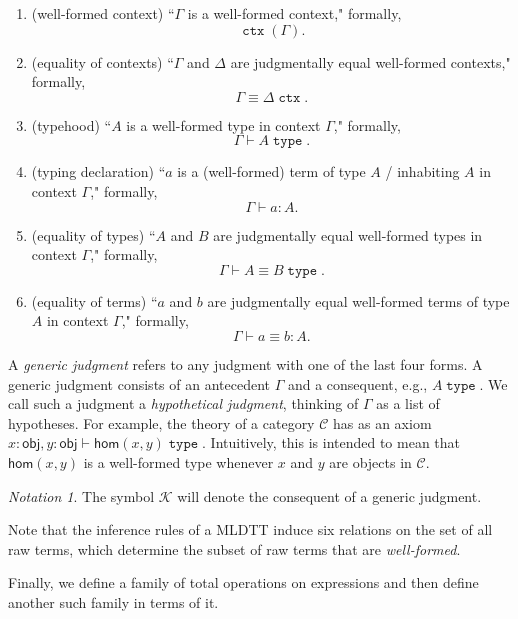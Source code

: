 \documentclass[10pt,letterpaper,cm]{nupset}
\theoremstyle{definition}
\theoremstyle{theorem}
\theoremstyle{remark}
\newtheorem*{notation}{Notation}
\newcommand{\K}{\mathcal K}
\newcommand{\0}{\mathbf{0}}
\newcommand{\1}{\mathbf{1}}
\newcommand{\2}{\mathbf{2}}
\DeclareMathOperator{\ctx}{\mathtt{ctx}}
\DeclareMathOperator{\type}{\mathtt{type}}
\renewcommand{\c}{\mathscr{C}}
\newcommand{\be}{\begin{enumerate}}
\newcommand{\ee}{\end{enumerate}}
\begin{document}
\begin{topbot}
\begin{minipage}{5.5 in}
\be
\item (well-formed context) ``$\Gamma$ is a well-formed context," formally, $$ \ctx(\Gamma)   .$$
\item (equality of contexts) ``$\Gamma$ and $\Delta$ are judgmentally equal well-formed contexts," formally, $$ \Gamma \equiv \Delta \ctx  .$$ 
\item (typehood) ``$A$ is a  well-formed type in  context $\Gamma$," formally, $$\Gamma \vdash A \type   .$$
\item (typing declaration) ``$a$ is a (well-formed) term of type $A$ / inhabiting $A$ in context $\Gamma$,"  formally, $$\Gamma \vdash a : A.$$
\item (equality of types) ``$A$ and $B$ are judgmentally equal well-formed types in context $\Gamma$,"  formally, $$ \Gamma \vdash A \equiv B \type  .$$
\item (equality of terms) ``$a$ and $b$ are judgmentally equal well-formed terms of type $A$ in context $\Gamma$,"  formally, $$ \Gamma \vdash a\equiv b : A    .$$
\ee
\end{minipage}
\end{topbot}

\medskip 

A \textit{generic judgment} refers to any judgment with one of the last four forms. A generic judgment  consists of an antecedent $\Gamma$ and a consequent, e.g., $A \type$. We call such a judgment a \textit{hypothetical judgment}, thinking of $\Gamma$ as a list of hypotheses. For example, the theory of a category $\c$ has as an axiom $x:\mathsf{obj}, y:\mathsf{obj} \vdash \mathsf{hom}(x,y) \type$. Intuitively, this is intended to mean that $\mathsf{hom}(x,y)$ is a well-formed type whenever $x$ and $y$ are objects in $\c$.

\begin{notation}
The symbol $\K$ will denote the consequent of a generic judgment.
\end{notation}

\medskip

Note that the inference rules of a MLDTT induce six relations on the set of all raw terms, which determine the subset of raw terms that are \textit{well-formed}. 

\bigskip

Finally, we define a family of total operations on expressions and then define another such family in terms of it.
\end{document}
